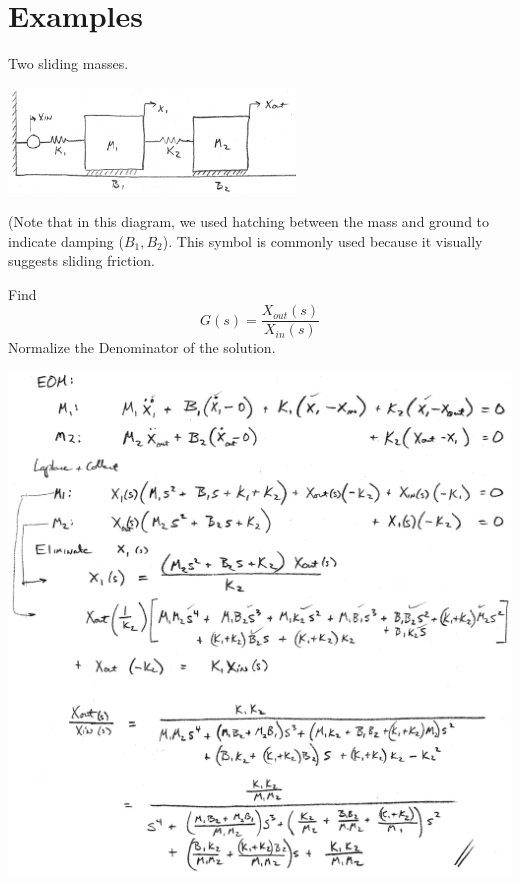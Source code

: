 \section{Examples}

\begin{Example}\label{3MassExample}
Two sliding masses.


\includegraphics[width=3.0in]{figs02/00727a.png}

(Note that in this diagram, we used hatching between the mass and ground to indicate damping ($B_1, B_2$).  This symbol is commonly used because it visually suggests sliding friction.

Find
\[
G(s) = \frac{X_{out}(s)}{X_{in}(s)}
\]
Normalize the Denominator of the solution.

\includegraphics[width=6.25in]{figs02/00729a.png}

\end{Example}



